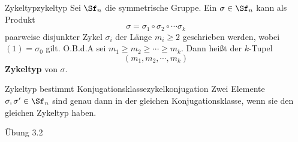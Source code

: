 \begin{definition}{Zykeltyp}{zykeltyp}
Sei $\Sf_n$ die symmetrische Gruppe. Ein $\sigma \in \Sf_n$ kann als Produkt
\begin{equation}
\sigma = \sigma_1 \circ \sigma_2 \circ \cdots \sigma_k
\end{equation}
paarweise disjunkter Zykel $\sigma_i$ der Länge $m_i \geq 2$ geschrieben werden, wobei $(1)=\sigma_0$ gilt. O.B.d.A sei $m_1 \geq m_2 \geq \cdots \geq m_k$. Dann heißt der $k$-Tupel 
\begin{equation}
(m_1, m_2, \cdots, m_k)
\end{equation}
\textbf{Zykeltyp} von $\sigma$.
\end{definition}
\begin{satz}{Zykeltyp bestimmt Konjugationsklasse}{zykelkonjugation}
Zwei Elemente $\sigma, \sigma' \in \Sf_n$ sind genau dann in der gleichen Konjugationsklasse, wenn sie den gleichen Zykeltyp haben.
\end{satz}
\begin{beweis}
Übung 3.2
\end{beweis}
